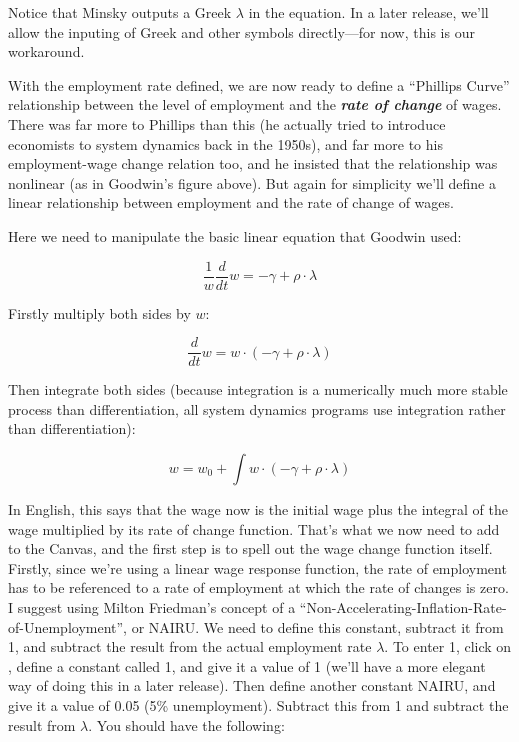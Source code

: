 Notice that Minsky outputs a Greek $\lambda$ in the equation. In a
later release, we'll allow the inputing of Greek and other symbols
directly---for now, this is our workaround. 


With the employment rate defined, we are now ready to define a
``Phillips Curve'' relationship between the level of employment and the
{\em\bf rate of change} of wages. There was far more to Phillips than this (he
actually tried to introduce economists to system dynamics back in the
1950s), and far more to his employment-wage change relation too, and
he insisted that the relationship was nonlinear (as in Goodwin's
figure above). But again for simplicity we'll define a linear
relationship between employment and the rate of change of wages. 

Here we need to manipulate the basic linear equation that Goodwin used:

\begin{displaymath}
\frac1w\frac d{dt}w = -\gamma+\rho\cdot\lambda
\end{displaymath}

Firstly multiply both sides by $w$:

\begin{displaymath}
\frac d{dt}w = w\cdot(-\gamma+\rho\cdot\lambda)
\end{displaymath}

Then integrate both sides (because integration is a numerically much
more stable process than differentiation, all system dynamics programs
use integration rather than differentiation): 

\begin{displaymath}
w=w_0+\int w\cdot(-\gamma+\rho\cdot\lambda)
\end{displaymath}

In English, this says that the wage now is the initial wage plus the
integral of the wage multiplied by its rate of change function. That's
what we now need to add to the Canvas, and the first step is to spell
out the wage change function itself. Firstly, since we're using a
linear wage response function, the rate of employment has to be
referenced to a rate of employment at which the rate of changes is
zero.  I suggest using Milton Friedman's concept of a
``Non-Accelerating-Inflation-Rate-of-Unemployment'', or NAIRU. We need
to define this constant, subtract it from 1, and subtract the result
from the actual employment rate $\lambda$. To enter 1, click on , define a
constant called 1, and give it a value of 1 (we'll have a more elegant
way of doing this in a later release). Then define another constant
NAIRU, and give it a value of 0.05 (5\% unemployment). Subtract this
from 1 and subtract the result from $\lambda$. You should have the following:

